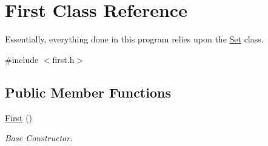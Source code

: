 \hypertarget{classFirst}{
\section{First Class Reference}
\label{classFirst}
}


Essentially, everything done in this program relies upon the \hyperlink{classSet}{Set} class.  




{\ttfamily \#include $<$first.h$>$}

\subsection*{Public Member Functions}
\begin{DoxyCompactItemize}
\item 
\hyperlink{classFirst_ab52a56e1bfd8e9de263574ef04296008}{First} ()
\begin{DoxyCompactList}\small\item\em Base Constructor. \item\end{DoxyCompactList}\end{DoxyCompactItemize}
